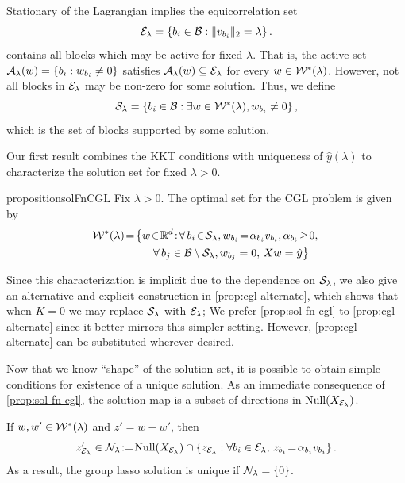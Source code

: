 Stationary of the Lagrangian implies the equicorrelation set
\[
    {\mathcal{E}_{\lambda}} = \left\{ {b_i} \in \mathcal{B} : \|v_{b_i}\|_2 = \lambda \right\}.
\]
contains all blocks which may be active for fixed \( \lambda \).
That is, the active set \( {\mathcal{A}_{\lambda}}(w) = \left\{{b_i} : w_{b_i} \neq 0\right\} \) satisfies
\( {\mathcal{A}_{\lambda}}(w) \subseteq {\mathcal{E}_{\lambda}} \) for every \( w \in \mathcal{W}^*(\lambda) \).
However, not all blocks in \( {\mathcal{E}_{\lambda}} \) may be non-zero for some solution.
Thus, we define
\[
    \mathcal{S}_\lambda = \left\{{b_i} \in \mathcal{B} : \exists w \in \mathcal{W}^*(\lambda), w_{b_i} \neq 0\right\},
\]
which is the set of blocks supported by some solution.

Our first result combines the KKT conditions with uniqueness of
\( \hat y(\lambda) \) to characterize the solution set for fixed
\( \lambda > 0 \).
\begin{restatable}{proposition}{solFnCGL}\label{prop:sol-fn-cgl}
    Fix \( \lambda > 0 \).
    The optimal set for the CGL problem is
    given by
    \begin{equation}\label{eq:sol-fn-cgl}
        \begin{aligned}
            \solfn(\lambda) \!=\!
            \big\{ & w \! \in \! \R^d \!:\!
            \forall \, \bi \! \in \! \calS_\lambda,
            \wi \!= \! \alpha_\bi \vi, \alpha_\bi \!\geq\! 0, \,             \\
                   & \quad \forall \, b_j \in \calB \setminus \calS_\lambda,
            \w_{b_j} = 0, \, X w = \hat y
            \big\}
        \end{aligned}
    \end{equation}
\end{restatable}

Since this characterization is implicit due to the dependence
on \( \mathcal{S}_\lambda \), we also give an alternative and explicit
construction in \cref{prop:cgl-alternate}, which shows that when \( K = 0 \)
we may replace \( \mathcal{S}_\lambda \)
with \( {\mathcal{E}_{\lambda}} \);
We prefer \cref{prop:sol-fn-cgl} to \cref{prop:cgl-alternate} since it
better mirrors this simpler setting.
However, \cref{prop:cgl-alternate} can be substituted wherever desired.

Now that we know ``shape'' of the solution set, it is
possible to obtain simple conditions for existence of a unique solution.
As an immediate consequence of \cref{prop:sol-fn-cgl},
the solution map is a subset of directions in \( \text{Null}(X_{\mathcal{E}_{\lambda}}) \).
\begin{corollary}\label{cor:uniqueness-cond-cgl}
    If \( w, w' \in \mathcal{W}^*(\lambda) \) and \( z' = w - w' \), then
    \[
        z_{\mathcal{E}_{\lambda}}' \in \mathcal{N}_\lambda \! := \! \text{Null}(X_{\mathcal{E}_{\lambda}}) \cap \left\{z_{\mathcal{E}_{\lambda}} :  \forall {b_i} \in {\mathcal{E}_{\lambda}}, \, z_{b_i} \! = \! \alpha_{b_i} v_{b_i}\right\}.
    \]
    As a result, the group lasso solution is unique if \( \mathcal{N}_\lambda = \left\{0\right\} \).
\end{corollary}

